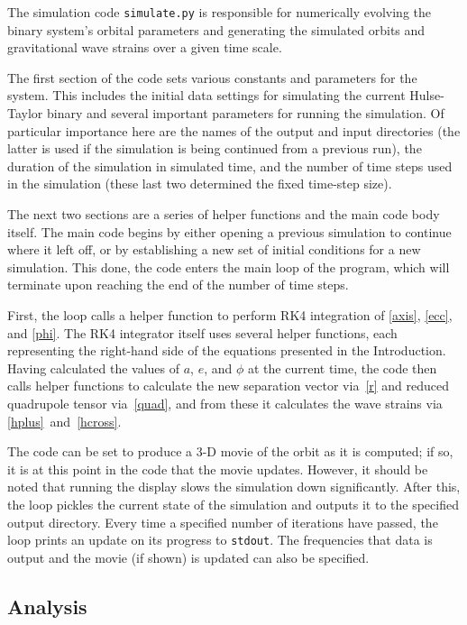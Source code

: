 \documentclass[preprint2]{aastex}
\begin{document}
The simulation code \texttt{simulate.py} is responsible for numerically evolving the binary system's orbital parameters and generating the simulated orbits and gravitational wave strains over a given time scale.

The first section of the code sets various constants and parameters for the system. This includes the initial data settings for simulating the current Hulse-Taylor binary and several important parameters for running the simulation. Of particular importance here are the names of the output and input directories (the latter is used if the simulation is being continued from a previous run), the duration of the simulation in simulated time, and the number of time steps used in the simulation (these last two determined the fixed time-step size).

The next two sections are a series of helper functions and the main code body itself. The main code begins by either opening a previous simulation to continue where it left off, or by establishing a new set of initial conditions for a new simulation. This done, the code enters the main loop of the program, which will terminate upon reaching the end of the  number of time steps.

First, the loop calls a helper function to perform RK4 integration of \eqref{axis}, \eqref{ecc}, and \eqref{phi}. The RK4 integrator itself uses several helper functions, each representing the right-hand side of the equations presented in the Introduction. Having calculated the values of $a$, $e$, and $\phi$ at the current time, the code then calls helper functions to calculate the new separation vector via~\eqref{r} and reduced quadrupole tensor via~\eqref{quad}, and from these it calculates the wave strains via \eqref{hplus}~and~\eqref{hcross}.

The code can be set to produce a 3-D movie of the orbit as it is computed; if so, it is at this point in the code that the movie updates. However, it should be noted that running the display slows the simulation down significantly. After this, the loop pickles the current state of the simulation and outputs it to the specified output directory. Every time a specified number of iterations have passed, the loop prints an update on its progress to \texttt{stdout}. The frequencies that data is output and the movie (if shown) is updated can also be specified.

\subsection{Analysis}
\end{document}
